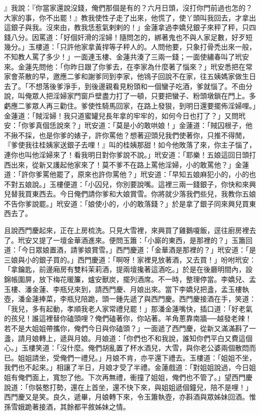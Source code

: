 』我說：『你當家還說沒錢，俺們那個是有的？六月日頭，沒打你門前過也怎的？大家的事，你不出罷！』教我使性子走了出來，他慌了，使丫頭叫我回去，才拿出這銀子與我。沒來由，教我恁惹氣剌剌的！」金蓮拿過李嬌兒銀子來秤了秤，只四錢八分。因罵道：「好個奸滑的淫婦！隨問怎的，綁著鬼也不與人家足數，好歹短幾分。」玉樓道：「只許他家拿黃捍等子秤人的。人問他要，只象打骨禿出來一般，不知教人罵了多少！」一面連玉樓、金蓮共湊了三兩一錢；一面使繡春叫了玳安來。金蓮先問他：「你昨日跟了你爹去，在李家為什麼著了惱來？」玳安悉把在常家會茶散的早，邀應二爹和謝爹同到李家，他鴇子回說不在家，往五姨媽家做生日去了。「不想落後爹淨手，到後邊親看見粉頭和一個蠻子吃酒，爹就惱了。不由分說，叫俺眾人把淫婦家門窗戶壁盡力打了一頓，只要把蠻子、粉頭墩鎖在門上。多虧應二爹眾人再三勸住。爹使性騎馬回家，在路上發狠，到明日還要擺佈淫婦哩。」金蓮道：「賊淫婦！我只道蜜罐兒長年拿的牢牢的，如何今日也打了？」又問玳安：「你爹真個恁說來？」玳安道：「莫是小的敢哄娘！」金蓮道：「賊囚根子，他不揪不採，也是你爹的婊子，許你罵他？想著迎頭兒我們使著你，只推不得閒， 『爹使我往桂姨家送銀子去哩！』叫的桂姨那甜！如今他敗落了來，你主子惱了，連你也叫他淫婦來了！看我明日對你爹說不說。」玳安道：「耶樂！五娘這回日頭打西出來，從新又護起他家來了！莫不爹不在路上罵他淫婦，小的敢罵他？」金蓮道：「許你爹罵他罷了，原來也許你罵他？」玳安道：「早知五娘麻犯小的，小的也不對五娘說。」玉樓便道：「小囚兒，你別要說嘴。這裡三兩一錢銀子，你快和來興兒替我買東西去。今日俺們請你爹和大娘賞雪。你將就少落我們些兒，我教你五娘不告你爹說罷。」玳安道：「娘使小的，小的敢落錢？」於是拿了銀子同來興兒買東西去了。

且說西門慶起來，正在上房梳洗。只見大雪裡，來興買了雞鵝嗄飯，逕往廚房裡去了。玳安又提了一壇金華酒進來。便問玉簫：「小廝的東西，是那裡的？」玉簫回道：「今日眾娘置酒，請爹娘賞雪。」西門慶道：「金華酒是那裡的？」玳安道：「是三娘與小的銀子買的。」西門慶道：「啊呀！家裡見放著酒，又去買！」吩咐玳安：「拿鑰匙，前邊廂房有雙料茉莉酒，提兩壇攙著這酒吃。」於是在後廳明間內，設錦帳圍屏，放下梅花暖簾，爐安獸炭，擺列酒席。不一時，整理停當。李嬌兒、孟玉樓、潘金蓮、李瓶兒來到，請西門慶、月娘出來。當下李嬌兒把盞，孟玉樓執壺，潘金蓮捧菜，李瓶兒陪跪，頭一鍾先遞了與西門慶。西門慶接酒在手，笑道：「我兒，多有起動，孝順我老人家常禮兒罷！」那潘金蓮嘴快，插口道：「好老氣的孩兒！誰這裡替你磕頭哩？俺們磕著你，你站著。羊角蔥靠南牆──越發老辣！若不是大姐姐帶攜你，俺們今日與你磕頭？」一面遞了西門慶，從新又滿滿斟了一盞，請月娘轉上，遞與月娘。月娘道：「你們也不和我說，誰知你們平白又費這個心。」玉樓笑道：「沒什麼。俺們胡亂置了杯水酒兒，大雪，與你老公婆兩個散悶而已。姐姐請坐，受俺們一禮兒。」月娘不肯，亦平還下禮去。玉樓道：「姐姐不坐，我們也不起來。」相讓了半日，月娘才受了半禮。金蓮戲道：「對姐姐說過，今日姐姐有俺們面上，寬恕了他。下次再無禮，衝撞了姐姐，俺們也不管了。」望西門慶說道：「你裝憨打勢，還在上首坐，還不快下來，與姐姐遞個鐘兒，陪不是哩！」西門慶又是笑。良久，遞畢，月娘轉下來，令玉簫執壺，亦斟酒與眾姊妹回酒。惟孫雪娥跪著接酒，其餘都平敘姊妹之情。

